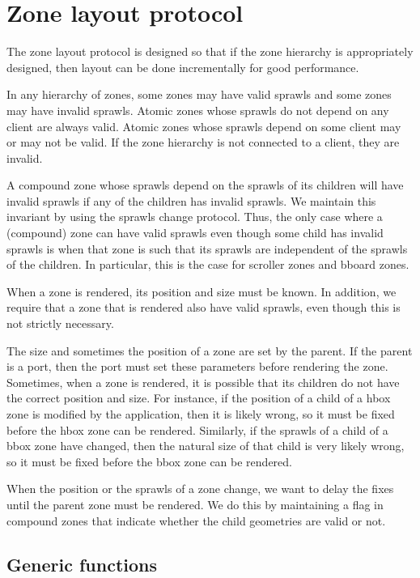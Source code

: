 \documentclass{report}
\begin{document}
\section{Zone layout protocol}

The zone layout protocol is designed so that if the zone hierarchy is
appropriately designed, then layout can be done incrementally for good
performance. 

In any hierarchy of zones, some zones may have valid sprawls and some
zones may have invalid sprawls.  Atomic zones whose sprawls do not depend
on any client are always valid.  Atomic zones whose sprawls depend on
some client may or may not be valid.  If the zone hierarchy is not
connected to a client, they are invalid. 

A compound zone whose sprawls depend on the sprawls of its children will
have invalid sprawls if any of the children has invalid sprawls.  We
maintain this invariant by using the sprawls change protocol.  Thus, the
only case where a (compound) zone can have valid sprawls even though
some child has invalid sprawls is when that zone is such that its sprawls
are independent of the sprawls of the children.  In particular, this is
the case for scroller zones and bboard zones.

When a zone is rendered, its position and size must be known.  In
addition, we require that a zone that is rendered also have valid
sprawls, even though this is not strictly necessary.

The size and sometimes the position of a zone are set by the parent.
If the parent is a port, then the port must set these parameters
before rendering the zone.  Sometimes, when a zone is rendered, it is
possible that its children do not have the correct position and size.
For instance, if the position of a child of a hbox zone is modified by
the application, then it is likely wrong, so it must be fixed before
the hbox zone can be rendered.  Similarly, if the sprawls of a child of
a bbox zone have changed, then the natural size of that child is very
likely wrong, so it must be fixed before the bbox zone can be
rendered.

When the position or the sprawls of a zone change, we want to delay the
fixes until the parent zone must be rendered.  We do this by
maintaining a flag in compound zones that indicate whether the child
geometries are valid or not.  

\subsection{Generic functions}
\end{document}
